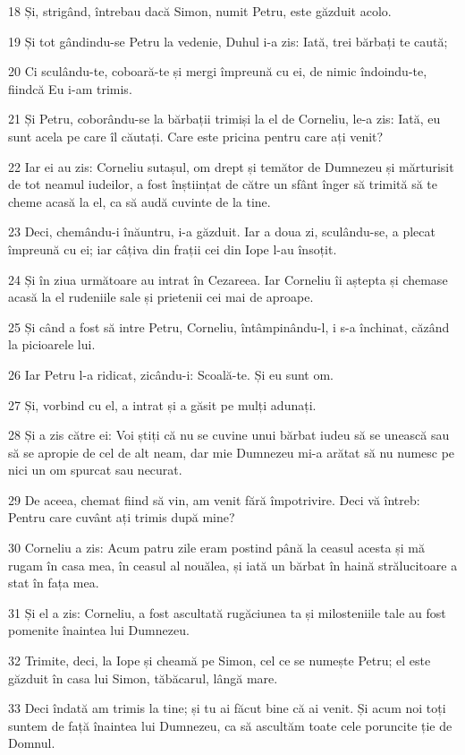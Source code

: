 \par 18 Și, strigând, întrebau dacă Simon, numit Petru, este găzduit acolo.
\par 19 Și tot gândindu-se Petru la vedenie, Duhul i-a zis: Iată, trei bărbați te caută;
\par 20 Ci sculându-te, coboară-te și mergi împreună cu ei, de nimic îndoindu-te, fiindcă Eu i-am trimis.
\par 21 Și Petru, coborându-se la bărbații trimiși la el de Corneliu, le-a zis: Iată, eu sunt acela pe care îl căutați. Care este pricina pentru care ați venit?
\par 22 Iar ei au zis: Corneliu sutașul, om drept și temător de Dumnezeu și mărturisit de tot neamul iudeilor, a fost înștiințat de către un sfânt înger să trimită să te cheme acasă la el, ca să audă cuvinte de la tine.
\par 23 Deci, chemându-i înăuntru, i-a găzduit. Iar a doua zi, sculându-se, a plecat împreună cu ei; iar câțiva din frații cei din Iope l-au însoțit.
\par 24 Și în ziua următoare au intrat în Cezareea. Iar Corneliu îi aștepta și chemase acasă la el rudeniile sale și prietenii cei mai de aproape.
\par 25 Și când a fost să intre Petru, Corneliu, întâmpinându-l, i s-a închinat, căzând la picioarele lui.
\par 26 Iar Petru l-a ridicat, zicându-i: Scoală-te. Și eu sunt om.
\par 27 Și, vorbind cu el, a intrat și a găsit pe mulți adunați.
\par 28 Și a zis către ei: Voi știți că nu se cuvine unui bărbat iudeu să se unească sau să se apropie de cel de alt neam, dar mie Dumnezeu mi-a arătat să nu numesc pe nici un om spurcat sau necurat.
\par 29 De aceea, chemat fiind să vin, am venit fără împotrivire. Deci vă întreb: Pentru care cuvânt ați trimis după mine?
\par 30 Corneliu a zis: Acum patru zile eram postind până la ceasul acesta și mă rugam în casa mea, în ceasul al nouălea, și iată un bărbat în haină strălucitoare a stat în fața mea.
\par 31 Și el a zis: Corneliu, a fost ascultată rugăciunea ta și milosteniile tale au fost pomenite înaintea lui Dumnezeu.
\par 32 Trimite, deci, la Iope și cheamă pe Simon, cel ce se numește Petru; el este găzduit în casa lui Simon, tăbăcarul, lângă mare.
\par 33 Deci îndată am trimis la tine; și tu ai făcut bine că ai venit. Și acum noi toți suntem de față înaintea lui Dumnezeu, ca să ascultăm toate cele poruncite ție de Domnul.
